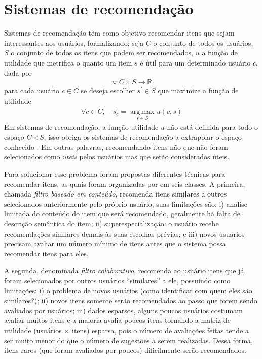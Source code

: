 \section{Sistemas de recomendação}\label{SEC_SISTEMAS_RECOMENDACAO}
Sistemas de recomendação têm como objetivo recomendar itens que sejam interessantes aos usuários, formalizando: seja \(C\) o conjunto de todos os usuários, \(S\) o conjunto de todos os itens que podem ser recomendados, \(u\) a função de utilidade que metrifica o quanto um item \(s\) é útil para um determinado usuário \(c\),
dada por 
\begin{align}
u : C \times S \rightarrow \mathbb{R}
\end{align}
para cada usuário \(c \in C \) se deseja escolher \(s^{'} \in S \) que maximize a função de utilidade 
\begin{align}
\forall c \in C,  \quad s_{c}^{'} =  \operatorname*{arg\,max}_{s \in S} u(c,s) \label{formalizar_recomendacao}
\end{align}
Em sistemas de recomendação, a função utilidade \(u\) não está definida para todo o espaço {\(C \times S\)}, isso obriga os sistemas de recomendação a extrapolar o espaço conhecido \cite{Adomavicius2005}. Em outras palavras, recomendando itens não que não foram selecionados como \emph{úteis} pelos usuários mas que serão considerados úteis.

Para solucionar esse problema foram propostas diferentes técnicas para recomendar itens, as quais foram organizadas por  em seis classes. A primeira, chamada \emph{filtro baseado em conteúdo}, recomenda itens similares a outros selecionados anteriormente pelo próprio usuário, suas limitações são: i) análise limitada do conteúdo do item que será recomendado, geralmente há falta de descrição semântica do item; ii) superespecialização: o usuário recebe recomendações similares demais às suas escolhas prévias; e iii) novos usuários precisam avaliar um número mínimo de itens antes que o sistema possa recomendar itens para eles.

A segunda, denominada \emph{filtro colaborativo}, recomenda ao usuário itens que já foram selecionados por outros usuários ``similares'' a ele, possuindo como limitações: i) o problema de novos usuários (como identificar com quem eles são similares?); ii) novos itens somente serão recomendados ao passo que forem sendo avaliados por usuários; iii) dados esparsos, alguns poucos usuários costumam avaliar muitos itens e a maioria avalia poucos itens tornando a matriz de utilidade (usuários \(\times\) itens) esparsa, pois o número de avaliações feitas tende a ser muito menor do que o número de sugestões a serem realizadas. Dessa forma, itens raros (que foram avaliados por poucos) dificilmente serão recomendados.

